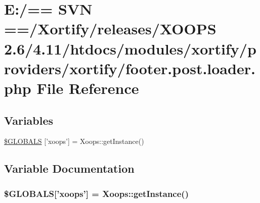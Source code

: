 \hypertarget{xortify_2footer_8post_8loader_8php}{\section{E\-:/== S\-V\-N ==/\-Xortify/releases/\-X\-O\-O\-P\-S 2.6/4.11/htdocs/modules/xortify/providers/xortify/footer.post.\-loader.\-php File Reference}
\label{xortify_2footer_8post_8loader_8php}
}
\subsection*{Variables}
\begin{DoxyCompactItemize}
\item 
\hyperlink{xortify_2footer_8post_8loader_8php_ad10934112c0d18cf6b358d47afa6fcf1}{\$\-G\-L\-O\-B\-A\-L\-S} \mbox{[}'xoops'\mbox{]} = Xoops\-::get\-Instance()
\end{DoxyCompactItemize}


\subsection{Variable Documentation}
\hypertarget{xortify_2footer_8post_8loader_8php_ad10934112c0d18cf6b358d47afa6fcf1}{
\subsubsection[{\$\-G\-L\-O\-B\-A\-L\-S}]{\setlength{\rightskip}{0pt plus 5cm}\$G\-L\-O\-B\-A\-L\-S\mbox{[}'xoops'\mbox{]} = Xoops\-::get\-Instance()}}\label{xortify_2footer_8post_8loader_8php_ad10934112c0d18cf6b358d47afa6fcf1}
